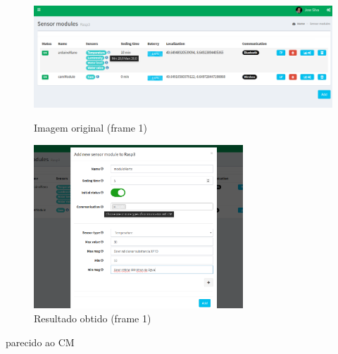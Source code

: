 \begin{figure}[h]
	\centering
	\begin{minipage}[b]{0.49\textwidth}
		\centering
		\includegraphics[width=\textwidth]{prints-web/sm_show.png}
		\caption{Imagem original (frame 1)}
		\label{bluetth05-res}
	\end{minipage}
	\hfill
	\begin{minipage}[b]{0.49\textwidth}
		\centering
		\includegraphics[width=0.7\textwidth]{prints-web/sm_add.png}
		\caption{Resultado obtido (frame 1)}
		\label{comimageesquema}
	\end{minipage}
\end{figure}




parecido ao CM 



\newpage












\newpage


